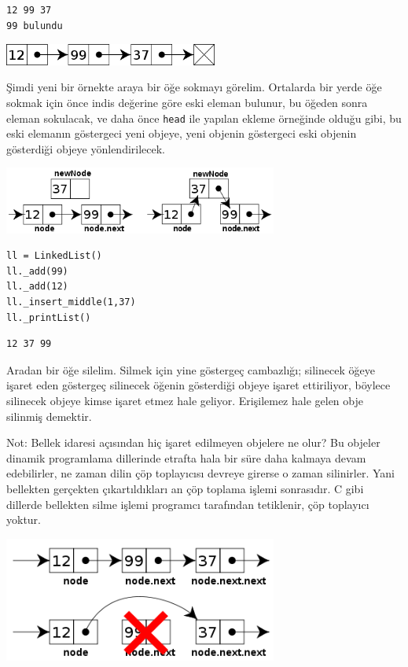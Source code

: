 \documentclass[12pt,fleqn]{article}\usepackage{../../common}
\begin{document}
\begin{verbatim}
12 99 37
99 bulundu
\end{verbatim}

\includegraphics[width=7cm]{basic_02.png}

Şimdi yeni bir örnekte araya bir öğe sokmayı görelim. Ortalarda bir yerde
öğe sokmak için önce indis değerine göre eski eleman bulunur, bu öğeden
sonra eleman sokulacak, ve daha önce \verb!head! ile yapılan ekleme
örneğinde olduğu gibi, bu eski elemanın göstergeci yeni objeye, yeni
objenin göstergeci eski objenin gösterdiği objeye yönlendirilecek.

\includegraphics[width=9cm]{basic_03.png}

\begin{verbatim}
ll = LinkedList()
ll._add(99)
ll._add(12)
ll._insert_middle(1,37)
ll._printList()
\end{verbatim}

\begin{verbatim}
12 37 99
\end{verbatim}

Aradan bir öğe silelim. Silmek için yine göstergeç cambazlığı; silinecek
öğeye işaret eden göstergeç silinecek öğenin gösterdiği objeye işaret
ettiriliyor, böylece silinecek objeye kimse işaret etmez hale
geliyor. Erişilemez hale gelen obje silinmiş demektir. 

Not: Bellek idaresi açısından hiç işaret edilmeyen objelere ne olur? Bu
objeler dinamik programlama dillerinde etrafta hala bir süre daha kalmaya
devam edebilirler, ne zaman dilin çöp toplayıcısı devreye girerse o zaman
silinirler. Yani bellekten gerçekten çıkartıldıkları an çöp toplama işlemi
sonrasıdır. C gibi dillerde bellekten silme işlemi programcı tarafından
tetiklenir, çöp toplayıcı yoktur. 

\includegraphics[width=9cm]{basic_04.png}
\end{document}
